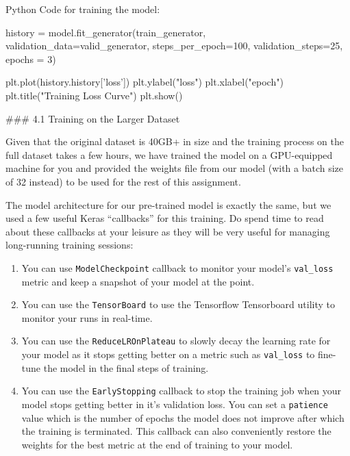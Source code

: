 \documentclass[11pt]{article}
\providecommand{\tightlist}{%
      \setlength{\itemsep}{0pt}\setlength{\parskip}{0pt}}
\newenvironment{Shaded}{}{}
\newcommand{\DecValTok}[1]{\textcolor[rgb]{0.25,0.63,0.44}{{#1}}}
\newcommand{\StringTok}[1]{\textcolor[rgb]{0.25,0.44,0.63}{{#1}}}
\newcommand{\NormalTok}[1]{{#1}}
\newcommand{\OperatorTok}[1]{\textcolor[rgb]{0.40,0.40,0.40}{{#1}}}
\begin{document}
Python Code for training the model:

\begin{Shaded}
\begin{Highlighting}[]
\NormalTok{history }\OperatorTok{=}\NormalTok{ model.fit_generator(train_generator, }
\NormalTok{                              validation_data}\OperatorTok{=}\NormalTok{valid_generator,}
\NormalTok{                              steps_per_epoch}\OperatorTok{=}\DecValTok{100}\NormalTok{, }
\NormalTok{                              validation_steps}\OperatorTok{=}\DecValTok{25}\NormalTok{, }
\NormalTok{                              epochs }\OperatorTok{=} \DecValTok{3}\NormalTok{)}

\NormalTok{plt.plot(history.history[}\StringTok{'loss'}\NormalTok{])}
\NormalTok{plt.ylabel(}\StringTok{"loss"}\NormalTok{)}
\NormalTok{plt.xlabel(}\StringTok{"epoch"}\NormalTok{)}
\NormalTok{plt.title(}\StringTok{"Training Loss Curve"}\NormalTok{)}
\NormalTok{plt.show()}
\end{Highlighting}
\end{Shaded}

     \#\#\# 4.1 Training on the Larger Dataset

Given that the original dataset is 40GB+ in size and the training
process on the full dataset takes a few hours, we have trained the model
on a GPU-equipped machine for you and provided the weights file from our
model (with a batch size of 32 instead) to be used for the rest of this
assignment.

The model architecture for our pre-trained model is exactly the same,
but we used a few useful Keras ``callbacks'' for this training. Do spend
time to read about these callbacks at your leisure as they will be very
useful for managing long-running training sessions:

\begin{enumerate}
\def\labelenumi{\arabic{enumi}.}
\tightlist
\item
  You can use \texttt{ModelCheckpoint} callback to monitor your model's
  \texttt{val\_loss} metric and keep a snapshot of your model at the
  point.
\item
  You can use the \texttt{TensorBoard} to use the Tensorflow Tensorboard
  utility to monitor your runs in real-time.
\item
  You can use the \texttt{ReduceLROnPlateau} to slowly decay the
  learning rate for your model as it stops getting better on a metric
  such as \texttt{val\_loss} to fine-tune the model in the final steps
  of training.
\item
  You can use the \texttt{EarlyStopping} callback to stop the training
  job when your model stops getting better in it's validation loss. You
  can set a \texttt{patience} value which is the number of epochs the
  model does not improve after which the training is terminated. This
  callback can also conveniently restore the weights for the best metric
  at the end of training to your model.
\end{enumerate}
\end{document}
